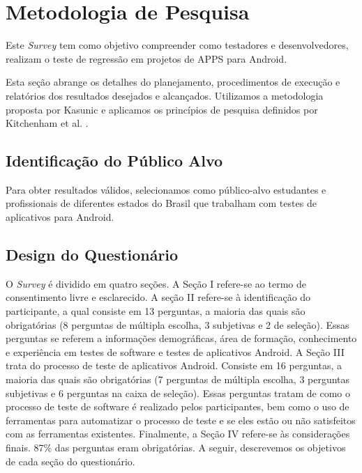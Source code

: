 \section{Metodologia de Pesquisa}\label{rmsurvey}

Este \textit{Survey} tem como objetivo compreender como testadores e desenvolvedores, realizam o teste de regressão em projetos de \ac{APPS} para Android.

Esta seção abrange os detalhes do planejamento, procedimentos de execução e relatórios dos resultados desejados e alcançados. Utilizamos a metodologia proposta por Kasunic \cite{Kasunic2005DesigningAE} e aplicamos os princípios de pesquisa definidos por Kitchenham et al. \cite{Kitchenham:2002:PSR:566493.566495}.


\subsection{Identificação do Público Alvo}

Para obter resultados válidos, selecionamos como público-alvo estudantes e profissionais de diferentes estados do Brasil que trabalham com testes de aplicativos para Android. 


\begin{comment}
Foram considerados três critérios:

\begin{enumerate}
    \item Pessoas que trabalham de forma autônoma; 
    \item Pessoas que trabalham / pesquisam em uma empresa; 
    \item Alunos pesquisando tópicos relacionados.
\end{enumerate}

\end{comment}

\subsection{Design do Questionário}


O \textit{Survey} é dividido em quatro seções. A Seção I refere-se ao termo de consentimento livre e esclarecido. A seção II refere-se à identificação do participante, a qual consiste em 13 perguntas, a maioria das quais são obrigatórias (8 perguntas de múltipla escolha, 3 subjetivas e 2 de seleção). Essas perguntas se referem a informações demográficas, área de formação, conhecimento e experiência em testes de software e testes de aplicativos Android. A Seção III trata do processo de teste de aplicativos Android. Consiste em 16 perguntas, a maioria das quais são obrigatórias (7 perguntas de múltipla escolha, 3 perguntas subjetivas e 6 perguntas na caixa de seleção). Essas perguntas tratam de como o processo de teste de software é realizado pelos participantes, bem como o uso de ferramentas para automatizar o processo de teste e se eles estão ou não satisfeitos com as ferramentas existentes. Finalmente, a Seção IV refere-se às considerações finais. 87\% das perguntas eram obrigatórias. A seguir, descrevemos os objetivos de cada seção do questionário.


